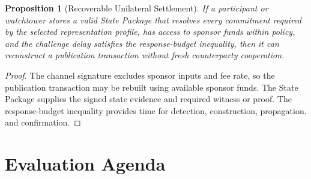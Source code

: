 \documentclass[a4paper,11pt]{article}
\newtheorem{proposition}{Proposition}
\begin{document}
\begin{proposition}[Recoverable Unilateral Settlement]
If a participant or watchtower stores a valid State Package that resolves every commitment required by the selected representation profile, has access to sponsor funds within policy, and the challenge delay satisfies the response-budget inequality, then it can reconstruct a publication transaction without fresh counterparty cooperation.
\end{proposition}

\begin{proof}
The channel signature excludes sponsor inputs and fee rate, so the publication transaction may be rebuilt using available sponsor funds. The State Package supplies the signed state evidence and required witness or proof. The response-budget inequality provides time for detection, construction, propagation, and confirmation.
\end{proof}

\clearpage
\section{Evaluation Agenda}
\end{document}
